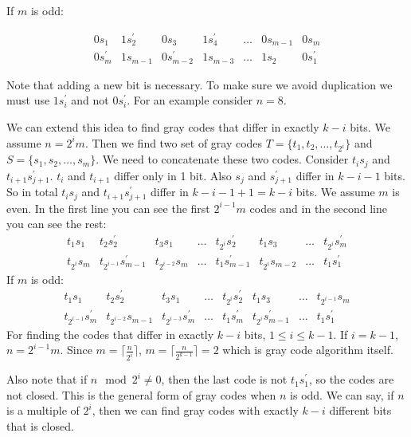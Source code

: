 \documentclass{book}
\begin{document}
	If $m$ is odd:
	
	\begin{equation*}
	\begin{matrix}
		0s_1 & 1s_2^\prime & 0s_3 & 1s_4^\prime & \dots & 0s_{m - 1} & 0s_m \\
		0s_m^\prime & 1s_{m - 1} & 0s_{m - 2}^\prime & 1s_{m - 3} & \dots & 1s_2 & 0s_1^\prime
	\end{matrix}
\end{equation*}
	
	Note that adding a new bit is necessary. To make sure we avoid duplication we must use $1s_i^\prime$ and not $0s_i^\prime$. For an example consider $n = 8$.
	\par We can extend this idea to find gray codes that differ in exactly $k - i$ bits. We assume $n = 2^im$. Then we find two set of gray codes $T = \{t_1, t_2, \dots, t_{2^i}\}$ and $S = \{s_1, s_2, \dots, s_m\}$. We need to concatenate these two codes. Consider $t_is_j$ and $t_{i + 1}s_{j + 1}^\prime$. $t_i$ and $t_{i + 1}$ differ only in 1 bit. Also $s_j$ and $s_{j + 1}^\prime$ differ in $k - i - 1$ bits. So in total $t_is_j$ and $t_{i + 1}s_{j + 1}^\prime$ differ in $k - i - 1 + 1 = k - i$ bits. We assume $m$ is even. In the first line you can see the first $2^{i - 1}m$ codes and in the second line you can see the rest:
	\begin{equation*}
		\begin{matrix}
			t_1s_1 & t_2s_2^\prime & t_3s_1 & \dots & t_{2^i}s_2^\prime & t_1s_3 & \dots & t_{2^i}s_m^\prime \\
			t_{2^i}s_m & t_{2^{i - 1}}s_{m - 1}^\prime & t_{2^{i - 2}}s_m & \dots &t_1s_{m -1}^\prime & t_{2^i}s_{m - 2} & \dots & t_1s_1^\prime
		\end{matrix}
	\end{equation*}
	If $m$ is odd:
	\begin{equation*}
	\begin{matrix}
		t_1s_1 & t_2s_2^\prime & t_3s_1 & \dots & t_{2^i}s_2^\prime & t_1s_3 & \dots & t_{2^{i - 1}}s_m \\
		t_{2^{i - 1}}s_m^\prime & t_{2^{i - 2}}s_{m - 1} & t_{2^{i - 3}}s_m^\prime & \dots &t_1s_{m}^\prime & t_{2^i}s_{m - 1}^\prime & \dots & t_1s_1^\prime
	\end{matrix}
\end{equation*}
	For finding the codes that differ in exactly $k - i$ bits, $1 \le i \le k - 1$. If $i = k - 1$, $n = 2^{i - 1}m$. Since $m = \lceil \frac{n}{2^i} \rceil$, $m = \lceil \frac{n}{2^{k - 1}} \rceil = 2$ which is gray code algorithm itself.
	\par Also note that if $n \mod 2^i \ne 0$, then the last code is not $t_1s_1^\prime$, so the codes are not closed. This is the general form of gray codes when $n$ is odd. We can say, if $n$ is a multiple of $2^i$, then we can find gray codes with exactly $k - i$ different bits that is closed.
	
\end{document}
